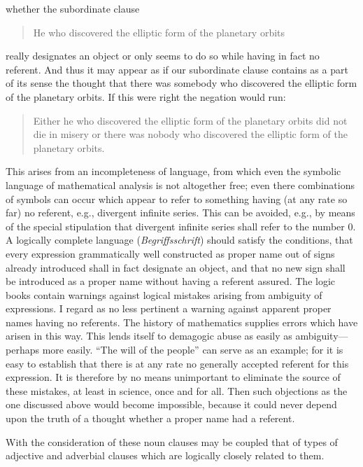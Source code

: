 \documentclass[twoside,12pt,a4paper]{article}
\begin{document}
\noindent whether the subordinate clause

\begin{quote}
  He who discovered the elliptic form of the planetary orbits
\end{quote}

\noindent really designates an object or only seems to do so while
having in fact no referent. And thus it may appear as if our
subordinate clause contains as a part of its sense the thought that
there was somebody who discovered the elliptic form of the planetary
orbits. If this were right the negation would run:

\begin{quote}
  Either he who discovered the elliptic form of the planetary orbits
  did not die in misery or there was nobody who discovered the
  elliptic form of the planetary orbits.
\end{quote}

\noindent {} This arises from an incompleteness of
language, from which even the symbolic language of mathematical
analysis is not altogether free; even there combinations of symbols
can occur which appear to refer to something having (at any rate so
far) no referent, e.g., divergent infinite series. This can be
avoided, e.g., by means of the special stipulation that divergent
infinite series shall refer to the
number 0. A logically complete language ({\it Begriffsschrift}) should
satisfy the conditions, that every expression grammatically well
constructed as proper name out of signs already introduced shall in
fact designate an object, and that no new sign shall be introduced as
a proper name without having a referent assured. The logic books
contain warnings against logical mistakes arising from ambiguity of
expressions. I regard as no less pertinent a warning against apparent
proper names having no referents. The history of mathematics supplies
errors which have arisen in this way. This lends itself to demagogic
abuse as easily as ambiguity---perhaps more easily. ``The will of the
people'' can serve as an example; for it is easy to establish that
there is at any rate no generally accepted referent for this
expression. It is therefore by no means unimportant to eliminate the
source of these mistakes, at least in science, once and for all. Then
such objections as the one discussed above would become impossible,
because it could never depend upon the truth of a thought whether a
proper name had a referent.

With the consideration of these noun clauses may be coupled that of
types of adjective and adverbial clauses which are logically closely
related to them.
\end{document}

